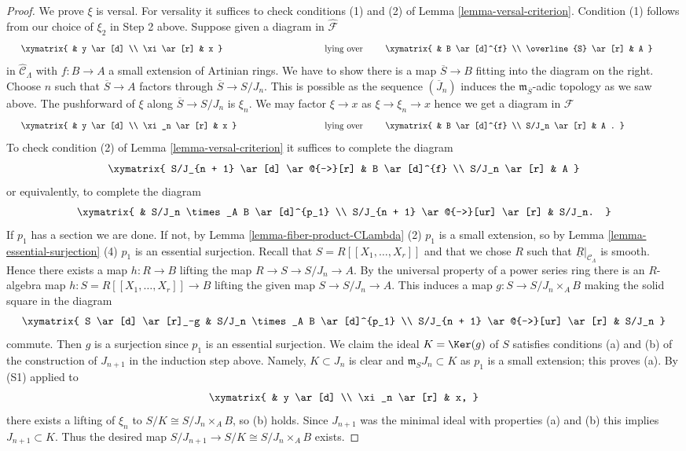 \begin{proof}
\medskip\noindent
We prove $\xi$ is versal. For versality it suffices to check
conditions (1) and (2) of
Lemma \ref{lemma-versal-criterion}.
Condition (1) follows from our choice of $\xi_2$ in Step 2 above.
Suppose given a diagram in $\widehat{\mathcal{F}}$
$$
\vcenter{
\xymatrix{
            &  y \ar[d] \\
\xi \ar[r]  &  x
}
}
\quad\text{lying over}\quad
\vcenter{
\xymatrix{
         &   B  \ar[d]^{f} \\
\overline{S} \ar[r] &   A
}
}
$$
in $\widehat{\mathcal{C}}_\Lambda$ with $f: B \to A$ a small extension
of Artinian rings. We have to show there is a map $\overline{S} \to B$ fitting
into the diagram on the right. Choose $n$ such that
$\overline{S} \to A$ factors through $\overline{S} \to S/J_n$. This is
possible as the sequence $(\overline{J}_n)$ induces the
$\mathfrak m_{\overline{S}}$-adic topology as we saw above.
The pushforward of $\xi$ along $\overline{S} \to S/J_n$ is $\xi_n$.
We may factor $\xi \to x$ as $\xi \to \xi_n \to x$ hence we get a diagram
in $\mathcal{F}$
$$
\vcenter{
\xymatrix{
            &  y \ar[d] \\
\xi_n \ar[r]  &  x
}
}
\quad\text{lying over}\quad
\vcenter{
\xymatrix{
         &   B  \ar[d]^{f} \\
S/J_n \ar[r] &   A .
}
}
$$
To check condition (2) of
Lemma \ref{lemma-versal-criterion}
it suffices to complete the diagram
$$
\xymatrix{
S/J_{n + 1} \ar[d] \ar@{-->}[r] & B \ar[d]^{f} \\
S/J_n   \ar[r] & A
}
$$
or equivalently, to complete the diagram
$$
\xymatrix{
  &  S/J_n \times_A B \ar[d]^{p_1} \\
S/J_{n + 1} \ar@{-->}[ur] \ar[r] &  S/J_n.
}
$$
If $p_1$ has a section we are done. If not, by
Lemma \ref{lemma-fiber-product-CLambda} (2)
$p_1$ is a small extension, so by
Lemma \ref{lemma-essential-surjection} (4)
$p_1$ is an essential surjection. Recall that $S = R[[X_1, \ldots, X_r]]$
and that we chose $R$ such that $\underline{R}|_{\mathcal{C}_\Lambda}$
is smooth. Hence there exists a map $h : R \to B$ lifting the map
$R \to S \to S/J_n \to A$. By the universal property of a power series
ring there is an $R$-algebra map $h : S = R[[X_1, \ldots, X_r]] \to B$
lifting the given map $S \to S/J_n \to A$. This induces a map
$g: S \to S/J_n \times_A B$ making the solid square in the diagram
$$
\xymatrix{
S \ar[d] \ar[r]_-g  &  S/J_n \times_A B \ar[d]^{p_1} \\
S/J_{n + 1} \ar@{-->}[ur] \ar[r] &  S/J_n
}
$$
commute. Then $g$ is a surjection since $p_1$ is an essential surjection.
We claim the ideal $K = \Ker(g)$ of $S$ satisfies conditions (a) and
(b) of the construction of $J_{n + 1}$ in the induction step above.
Namely, $K \subset J_n$ is clear and $\mathfrak m_SJ_n \subset K$ as $p_1$
is a small extension; this proves (a). By (S1) applied to
$$
\xymatrix{
            &  y \ar[d] \\
\xi_n \ar[r]  &  x,
}
$$
there exists a lifting of $\xi_n$ to $S/K \cong S/J_n \times_A B$, so (b)
holds. Since $J_{n + 1}$ was the minimal ideal with properties (a) and (b)
this implies $J_{n + 1} \subset K$. Thus the desired map
$S/J_{n+1} \to S/K \cong S/J_n \times_A B$ exists.
\end{proof}
